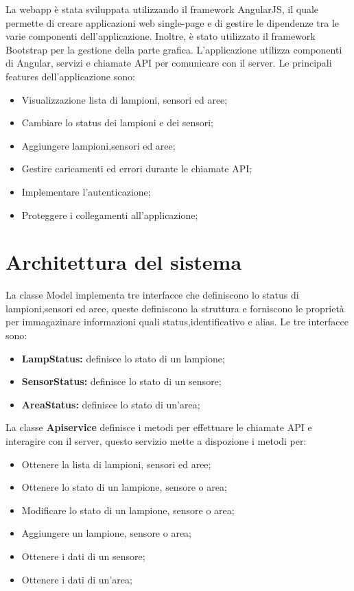 La webapp è stata sviluppata utilizzando il framework AngularJS, il quale permette di creare applicazioni web single-page e di gestire le dipendenze tra le varie componenti dell'applicazione. Inoltre, è stato utilizzato il framework Bootstrap per la gestione della parte grafica. L'applicazione utilizza componenti di Angular, servizi e chiamate API per comunicare con il server. Le principali features dell'applicazione sono:
\begin{itemize}
    \item Visualizzazione lista di lampioni, sensori ed aree;
    \item Cambiare lo status dei lampioni e dei sensori;
    \item Aggiungere lampioni,sensori ed aree;
    \item Gestire caricamenti ed errori durante le chiamate API;
    \item Implementare l'autenticazione;
    \item Proteggere i collegamenti all'applicazione; 
\end{itemize} 

\section{Architettura del sistema}

La classe Model implementa tre interfacce che definiscono lo status di lampioni,sensori ed aree, queste definiscono la struttura e forniscono le proprietà per immagazinare informazioni quali status,identificativo e alias.
Le tre interfacce sono:
\begin{itemize}
    \item \textbf{LampStatus:} definisce lo stato di un lampione;
    \item \textbf{SensorStatus:} definisce lo stato di un sensore;
    \item \textbf{AreaStatus:} definisce lo stato di un'area;
\end{itemize}

La classe \textbf{Apiservice} definisce i metodi per effettuare le chiamate API e interagire con il server, questo servizio mette a dispozione i metodi per:
\begin{itemize}
    \item Ottenere la lista di lampioni, sensori ed aree;
    \item Ottenere lo stato di un lampione, sensore o area;
    \item Modificare lo stato di un lampione, sensore o area;
    \item Aggiungere un lampione, sensore o area;
    \item Ottenere i dati di un sensore;
    \item Ottenere i dati di un'area;
\end{itemize}

